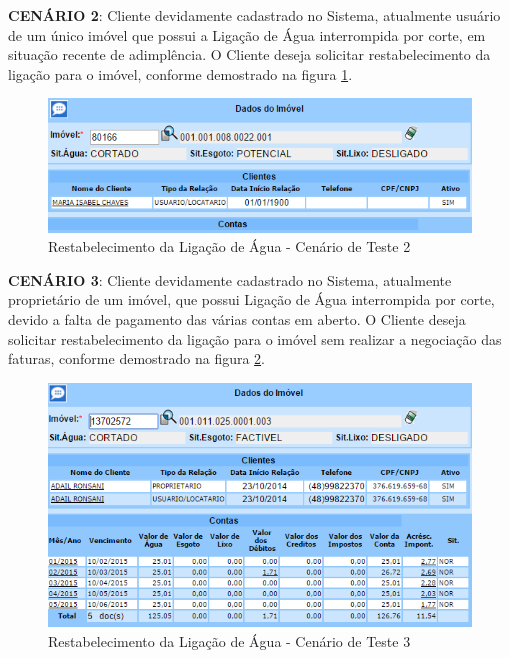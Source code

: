 \begin{flushleft}
	\begin{description}
		\item \textbf{CENÁRIO 2}: Cliente devidamente cadastrado no Sistema, atualmente usuário de um único imóvel que possui a Ligação de Água interrompida por corte, em situação recente de adimplência. O Cliente deseja solicitar restabelecimento da ligação para o imóvel, conforme demostrado na figura \ref{figura:restabelecimentoLigacaoCenario2}.
		\begin{figure}[H]
			\centering
			\caption{Restabelecimento da Ligação de Água - Cenário de Teste 2}
			\label{figura:restabelecimentoLigacaoCenario2}
			\includegraphics{figuras/cenarios/restabelecimento/cenario_2.PNG}
		\end{figure}
	\end{description}
	
	\begin{description}
		\item \textbf{CENÁRIO 3}: Cliente devidamente cadastrado no Sistema, atualmente proprietário de um imóvel, que possui Ligação de Água interrompida por corte, devido a falta de pagamento das várias contas em aberto. O Cliente deseja solicitar restabelecimento da ligação para o imóvel sem realizar a negociação das faturas, conforme demostrado na figura \ref{figura:restabelecimentoLigacaoCenario3}.
		\begin{figure}[H]
			\centering
			\caption{Restabelecimento da Ligação de Água - Cenário de Teste 3}
			\label{figura:restabelecimentoLigacaoCenario3}
			\includegraphics{figuras/cenarios/restabelecimento/cenario_3.PNG}
			\legend {\fontsize{10}{12}\selectfont {Fonte: Autoria Própria}.}	
		\end{figure}
	\end{description}

\end{flushleft}	


